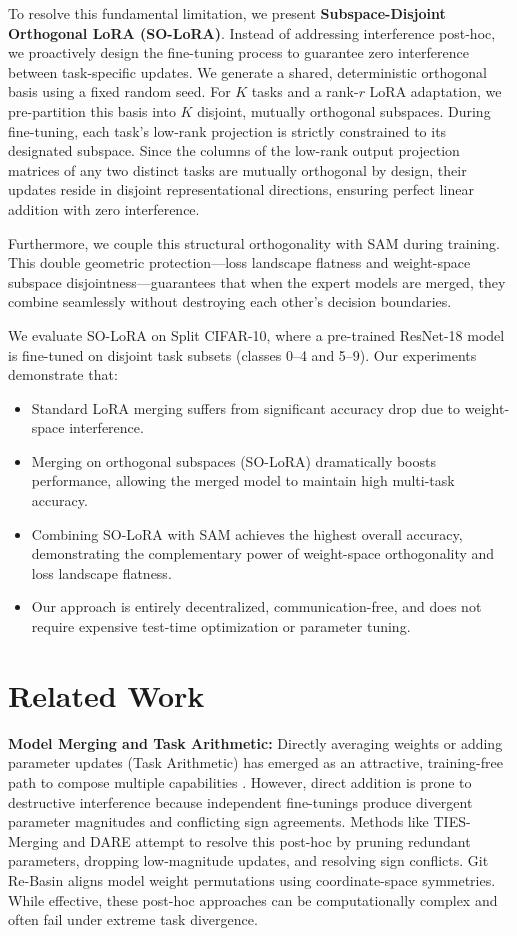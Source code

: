 \documentclass{article}
\theoremstyle{plain}
\theoremstyle{definition}
\theoremstyle{remark}
\begin{document}
To resolve this fundamental limitation, we present \textbf{Subspace-Disjoint Orthogonal LoRA (SO-LoRA)}. Instead of addressing interference post-hoc, we proactively design the fine-tuning process to guarantee zero interference between task-specific updates. 
We generate a shared, deterministic orthogonal basis using a fixed random seed. For $K$ tasks and a rank-$r$ LoRA adaptation, we pre-partition this basis into $K$ disjoint, mutually orthogonal subspaces. During fine-tuning, each task's low-rank projection is strictly constrained to its designated subspace. Since the columns of the low-rank output projection matrices of any two distinct tasks are mutually orthogonal by design, their updates reside in disjoint representational directions, ensuring perfect linear addition with zero interference.

Furthermore, we couple this structural orthogonality with SAM during training. This double geometric protection---loss landscape flatness and weight-space subspace disjointness---guarantees that when the expert models are merged, they combine seamlessly without destroying each other's decision boundaries.

We evaluate SO-LoRA on Split CIFAR-10, where a pre-trained ResNet-18 model is fine-tuned on disjoint task subsets (classes 0--4 and 5--9). Our experiments demonstrate that:
\begin{itemize}
  \item Standard LoRA merging suffers from significant accuracy drop due to weight-space interference.
  \item Merging on orthogonal subspaces (SO-LoRA) dramatically boosts performance, allowing the merged model to maintain high multi-task accuracy.
  \item Combining SO-LoRA with SAM achieves the highest overall accuracy, demonstrating the complementary power of weight-space orthogonality and loss landscape flatness.
  \item Our approach is entirely decentralized, communication-free, and does not require expensive test-time optimization or parameter tuning.
\end{itemize}

\section{Related Work}
\label{related}

\textbf{Model Merging and Task Arithmetic:} Directly averaging weights or adding parameter updates (Task Arithmetic) has emerged as an attractive, training-free path to compose multiple capabilities \cite{wortsman2022model, ilharco2022editing}. However, direct addition is prone to destructive interference because independent fine-tunings produce divergent parameter magnitudes and conflicting sign agreements. Methods like TIES-Merging \cite{yadav2023ties} and DARE \cite{yu2024dare} attempt to resolve this post-hoc by pruning redundant parameters, dropping low-magnitude updates, and resolving sign conflicts. Git Re-Basin \cite{ainsworth2022git} aligns model weight permutations using coordinate-space symmetries. While effective, these post-hoc approaches can be computationally complex and often fail under extreme task divergence.
\end{document}

